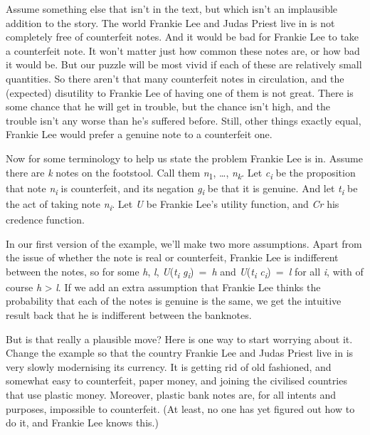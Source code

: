 \documentclass[
  11pt,
  letterpaper,
  DIV=11,
  numbers=noendperiod,
  twoside]{scrartcl}
\begin{document}
Assume something else that isn't in the text, but which isn't an
implausible addition to the story. The world Frankie Lee and Judas
Priest live in is not completely free of counterfeit notes. And it would
be bad for Frankie Lee to take a counterfeit note. It won't matter just
how common these notes are, or how bad it would be. But our puzzle will
be most vivid if each of these are relatively small quantities. So there
aren't that many counterfeit notes in circulation, and the (expected)
disutility to Frankie Lee of having one of them is not great. There is
some chance that he will get in trouble, but the chance isn't high, and
the trouble isn't any worse than he's suffered before. Still, other
things exactly equal, Frankie Lee would prefer a genuine note to a
counterfeit one.

Now for some terminology to help us state the problem Frankie Lee is in.
Assume there are \emph{k} notes on the footstool. Call them
\emph{n}\textsubscript{1}, \ldots, \emph{n\textsubscript{k}}. Let
\emph{c\textsubscript{i}} be the proposition that note
\emph{n\textsubscript{i}} is counterfeit, and its negation
\emph{g\textsubscript{i}} be that it is genuine. And let
\emph{t\textsubscript{i}} be the act of taking note
\emph{n\textsubscript{i}}. Let \emph{U} be Frankie Lee's utility
function, and \emph{Cr} his credence function.

In our first version of the example, we'll make two more assumptions.
Apart from the issue of whether the note is real or counterfeit, Frankie
Lee is indifferent between the notes, so for some \emph{h}, \emph{l},
\emph{U}(\emph{t\textsubscript{i}} \textbar{}
\emph{g\textsubscript{i}})~=~\emph{h} and
\emph{U}(\emph{t\textsubscript{i}} \textbar{}
\emph{c\textsubscript{i}})~=~\emph{l} for all \emph{i}, with of course
\emph{h} \textgreater{} \emph{l}. If we add an extra assumption that
Frankie Lee thinks the probability that each of the notes is genuine is
the same, we get the intuitive result back that he is indifferent
between the banknotes.

But is that really a plausible move? Here is one way to start worrying
about it. Change the example so that the country Frankie Lee and Judas
Priest live in is very slowly modernising its currency. It is getting
rid of old fashioned, and somewhat easy to counterfeit, paper money, and
joining the civilised countries that use plastic money. Moreover,
plastic bank notes are, for all intents and purposes, impossible to
counterfeit. (At least, no one has yet figured out how to do it, and
Frankie Lee knows this.)
\end{document}
